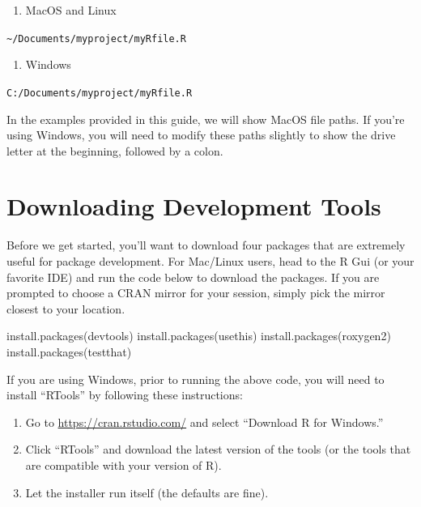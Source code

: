 \documentclass[
]{book}
\newenvironment{Shaded}{\begin{snugshade}}{\end{snugshade}}
\newcommand{\FunctionTok}[1]{\textcolor[rgb]{0.00,0.00,0.00}{#1}}
\newcommand{\NormalTok}[1]{#1}
\newcommand{\StringTok}[1]{\textcolor[rgb]{0.31,0.60,0.02}{#1}}
\providecommand{\tightlist}{%
  \setlength{\itemsep}{0pt}\setlength{\parskip}{0pt}}
\begin{document}
\begin{enumerate}
\def\labelenumi{\arabic{enumi}.}
\tightlist
\item
  MacOS and Linux
\end{enumerate}

\texttt{\textasciitilde{}/Documents/myproject/myRfile.R}

\begin{enumerate}
\def\labelenumi{\arabic{enumi}.}
\setcounter{enumi}{1}
\tightlist
\item
  Windows
\end{enumerate}

\texttt{C:/Documents/myproject/myRfile.R}

In the examples provided in this guide, we will show MacOS file paths. If you're using Windows, you will need to modify these paths slightly to show the drive letter at the beginning, followed by a colon.

\hypertarget{downloading-development-tools}{%
\section{Downloading Development Tools}\label{downloading-development-tools}}

Before we get started, you'll want to download four packages that are extremely useful for package development. For Mac/Linux users, head to the R Gui (or your favorite IDE) and run the code below to download the packages. If you are prompted to choose a CRAN mirror for your session, simply pick the mirror closest to your location.

\begin{Shaded}
\begin{Highlighting}[]
\FunctionTok{install.packages}\NormalTok{(}\StringTok{\textquotesingle{}devtools\textquotesingle{}}\NormalTok{)}
\FunctionTok{install.packages}\NormalTok{(}\StringTok{\textquotesingle{}usethis\textquotesingle{}}\NormalTok{)}
\FunctionTok{install.packages}\NormalTok{(}\StringTok{\textquotesingle{}roxygen2\textquotesingle{}}\NormalTok{)}
\FunctionTok{install.packages}\NormalTok{(}\StringTok{\textquotesingle{}testthat\textquotesingle{}}\NormalTok{)}
\end{Highlighting}
\end{Shaded}

If you are using Windows, prior to running the above code, you will need to install ``RTools'' by following these instructions:

\begin{enumerate}
\def\labelenumi{\arabic{enumi}.}
\item
  Go to \url{https://cran.rstudio.com/} and select ``Download R for Windows.''
\item
  Click ``RTools'' and download the latest version of the tools (or the tools that are compatible with your version of R).
\item
  Let the installer run itself (the defaults are fine).
\end{enumerate}
\end{document}

